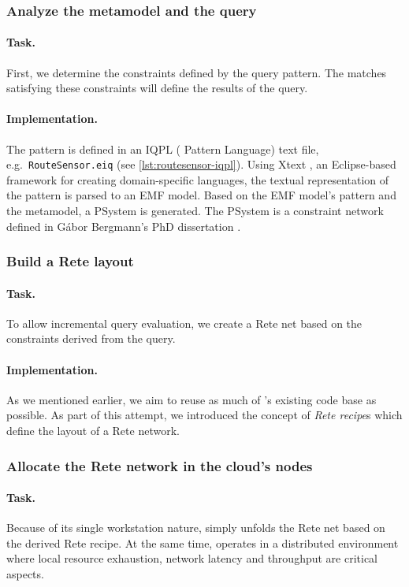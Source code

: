 \subsubsection{Analyze the metamodel and the query}

\paragraph{Task.} First, we determine the constraints defined by the query pattern. The matches satisfying these constraints will define the results of the query.

\paragraph{Implementation.} The pattern is defined in an IQPL (\iq{} Pattern Language) text file, e.g.\ \texttt{RouteSensor.eiq} (see \autoref{lst:routesensor-iqpl}). Using Xtext \cite{Xtext}, an Eclipse-based framework for creating domain-specific languages, the textual representation of the pattern is parsed to an EMF model. Based on the EMF model's pattern and the metamodel, a PSystem is generated. The PSystem is a constraint network defined in Gábor Bergmann's PhD dissertation \cite{PSystem}. 

\subsubsection{Build a Rete layout}

\paragraph{Task.} To allow incremental query evaluation, we create a Rete net based on the constraints derived from the query.

\paragraph{Implementation.} As we mentioned earlier, we aim to reuse as much of \eiq{}'s existing code base as possible. As part of this attempt, we introduced the concept of \textit{Rete recipe}s which define the layout of a Rete network.    

\subsubsection{Allocate the Rete network in the cloud's nodes} 

\paragraph{Task.} Because of its single workstation nature, \eiq{} simply unfolds the Rete net based on the derived Rete recipe. At the same time, \iqd{} operates in a distributed environment where local resource exhaustion, network latency and throughput are critical aspects. 

